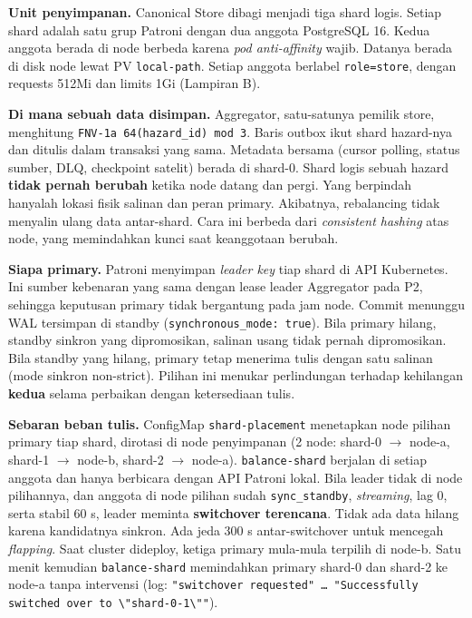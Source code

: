 \textbf{Unit penyimpanan.} Canonical Store dibagi menjadi tiga shard logis. Setiap shard adalah satu grup Patroni dengan dua anggota PostgreSQL 16. Kedua anggota berada di node berbeda karena \emph{pod anti-affinity} wajib. Datanya berada di disk node lewat PV \texttt{local-\allowbreak{}path}. Setiap anggota berlabel \texttt{role=\allowbreak{}store}, dengan requests 512Mi dan limits 1Gi (Lampiran B).


\textbf{Di mana sebuah data disimpan.} Aggregator, satu-satunya pemilik store, menghitung \texttt{FNV-\allowbreak{}1a 64(hazard\_\allowbreak{}id) mod 3}. Baris outbox ikut shard hazard-nya dan ditulis dalam transaksi yang sama. Metadata bersama (cursor polling, status sumber, DLQ, checkpoint satelit) berada di shard-0. Shard logis sebuah hazard \textbf{tidak pernah berubah} ketika node datang dan pergi. Yang berpindah hanyalah lokasi fisik salinan dan peran primary. Akibatnya, rebalancing tidak menyalin ulang data antar-shard. Cara ini berbeda dari \emph{consistent hashing} atas node, yang memindahkan kunci saat keanggotaan berubah.


\textbf{Siapa primary.} Patroni menyimpan \emph{leader key} tiap shard di API Kubernetes. Ini sumber kebenaran yang sama dengan lease leader Aggregator pada P2, sehingga keputusan primary tidak bergantung pada jam node. Commit menunggu WAL tersimpan di standby (\texttt{synchronous\_\allowbreak{}mode: true}). Bila primary hilang, standby sinkron yang dipromosikan, salinan usang tidak pernah dipromosikan. Bila standby yang hilang, primary tetap menerima tulis dengan satu salinan (mode sinkron non-strict). Pilihan ini menukar perlindungan terhadap kehilangan \textbf{kedua} selama perbaikan dengan ketersediaan tulis.


\textbf{Sebaran beban tulis.} ConfigMap \texttt{shard-\allowbreak{}placement} menetapkan node pilihan primary tiap shard, dirotasi di node penyimpanan (2 node: shard-0 $\rightarrow$ node-a, shard-1 $\rightarrow$ node-b, shard-2 $\rightarrow$ node-a). \texttt{balance-\allowbreak{}shard} berjalan di setiap anggota dan hanya berbicara dengan API Patroni lokal. Bila leader tidak di node pilihannya, dan anggota di node pilihan sudah \texttt{sync\_\allowbreak{}standby}, \emph{streaming}, lag 0, serta stabil 60 s, leader meminta \textbf{switchover terencana}. Tidak ada data hilang karena kandidatnya sinkron. Ada jeda 300 s antar-switchover untuk mencegah \emph{flapping}. Saat cluster dideploy, ketiga primary mula-mula terpilih di node-b. Satu menit kemudian \texttt{balance-\allowbreak{}shard} memindahkan primary shard-0 dan shard-2 ke node-a tanpa intervensi (log: \texttt{"switchover requested" \ldots{} "Successfully switched over to \textbackslash{}"shard-\allowbreak{}0-\allowbreak{}1\textbackslash{}""}).


